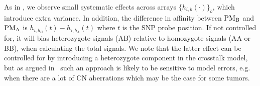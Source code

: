 \documentclass{bioinfo}
\newcommand{\PMA}{\ensuremath{\textnormal{PM}_\textnormal{A}}\xspace}
\newcommand{\PMB}{\ensuremath{\textnormal{PM}_\textnormal{B}}\xspace}
\begin{document}
As in \citet{CarvalhoB_etal_2007}, we observe small systematic effects across arrays $\{h_{i,b}(\cdot)\}_b$, which introduce extra variance.  In addition, the difference in affinity between \PMB and \PMA is $h_{i,b_B}(t) - h_{i,b_A}(t)$ where $t$ is the SNP probe position.  If not controlled for, it will bias heterozygote signals (AB) relative to homozygote signals (AA or BB), when calculating the total signals.
We note that the latter effect can be controlled for by introducing a heterozygote component in the crosstalk model, but as argued in~\citet{BengtssonH_etal_2008} such an approach is likely to be sensitive to model errors, e.g. when there are a lot of CN aberrations which may be the case for some tumors.
\end{document}
